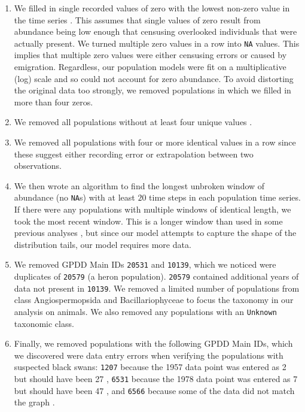 \begin{enumerate}
\item We filled in single recorded values of zero with the lowest non-zero
  value in the time series \citep[following][]{brook2006a}. This assumes that
  single values of zero result from abundance being low enough that censusing
  overlooked individuals that were actually present. We turned multiple zero
  values in a row into \texttt{NA} values. This implies that multiple zero
  values were either censusing errors or caused by emigration. Regardless, our
  population models were fit on a multiplicative (log) scale and so could not
  account for zero abundance. To avoid distorting the original data too
  strongly, we removed populations in which we filled in more than four zeros.

\item We removed all populations without at least four unique values
  \citep[following][]{brook2006a}.

\item We removed all populations with four or more identical values in a row
  since these suggest either recording error or extrapolation between two
  observations.

\item We then wrote an algorithm to find the longest unbroken window of
  abundance (no \texttt{NA}s) with at least $20$ time steps in each population
  time series. If there were any populations with multiple windows of identical
  length, we took the most recent window. This is a longer window than used in
  some previous analyses \citep[e.g.][]{brook2006a}, but since our model
  attempts to capture the shape of the distribution tails, our model requires
  more data.

\item We removed GPDD Main IDs \texttt{20531} and \texttt{10139}, which we
  noticed were duplicates of \texttt{20579} (a heron population).
  \texttt{20579} contained additional years of data not present in
  \texttt{10139}. We removed a limited number of populations from class
  Angiospermopsida and Bacillariophyceae to focus the taxonomy in our analysis
  on animals. We also removed any populations with an \texttt{Unknown}
  taxonomic class.

\item Finally, we removed populations with the following GPDD Main IDs, which
  we discovered were data entry errors when verifying the populations with
  suspected black swans: \texttt{1207} because the 1957 data point was entered
  as 2 but should have been 27 \citep{kendeigh1982}, \texttt{6531} because the
  1978 data point was entered as 7 but should have been 47 \citep{minot1986},
  and \texttt{6566} because some of the data did not match the graph
  \citep{heessen1996}.

\end{enumerate}


